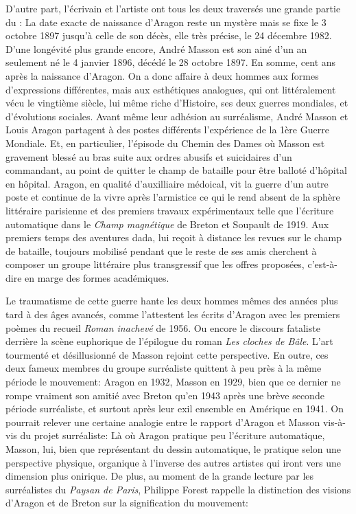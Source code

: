 D’autre part, l’écrivain et l’artiste ont tous les deux traversés une grande partie du : La date exacte de naissance d’Aragon reste un mystère mais se fixe le 3 octobre 1897 jusqu’à celle de son décès, elle très précise, le 24 décembre 1982. D’une longévité plus grande encore, André Masson est son ainé d’un an seulement né le 4 janvier 1896, décédé le 28 octobre 1897. En somme, cent ans après la naissance d’Aragon. On a donc affaire à deux hommes aux formes d’expressions différentes, mais aux esthétiques analogues, qui ont littéralement vécu le vingtième siècle, lui même riche d’Histoire, ses deux guerres mondiales, et d’évolutions sociales. Avant même leur adhésion au surréalisme, André Masson et Louis Aragon partagent à des postes différents l’expérience de la 1ère Guerre Mondiale. Et, en particulier, l’épisode du Chemin des Dames où Masson est gravement blessé au bras suite aux ordres abusifs et suicidaires d’un commandant, au point de quitter le champ de bataille pour être balloté d’hôpital en hôpital. Aragon, en qualité d'auxilliaire médoical, vit la guerre d’un autre poste et continue de la vivre après l’armistice ce qui le rend absent de la sphère littéraire parisienne et des premiers travaux expérimentaux telle que l’écriture automatique dans le \emph{Champ magnétique} de Breton et Soupault de 1919. Aux premiers temps des aventures dada, lui reçoit à distance les revues sur le champ de bataille, toujours mobilisé pendant que le reste de ses amis cherchent à composer un groupe littéraire plus transgressif que les offres proposées, c'est-à-dire en marge des formes académiques. 

Le traumatisme de cette guerre hante les deux hommes mêmes des années plus tard à des âges avancés, comme l’attestent les écrits d’Aragon avec les premiers poèmes du recueil \emph{Roman inachevé} de 1956. Ou encore  le discours fataliste derrière la scène euphorique de l’épilogue du roman \emph{Les cloches de Bâle}. L’art tourmenté et désillusionné de Masson rejoint cette perspective. En outre, ces deux fameux membres du groupe surréaliste quittent à peu près à la même période le mouvement: Aragon en 1932, Masson en 1929, bien que ce dernier ne rompe vraiment son amitié avec Breton qu’en 1943 après une brève seconde période surréaliste, et surtout après leur exil ensemble en Amérique en 1941. On pourrait relever une certaine analogie entre le rapport d’Aragon et Masson vis-à-vis du projet surréaliste: Là où Aragon pratique peu l’écriture automatique, Masson, lui, bien que représentant du dessin automatique, le pratique selon une perspective physique, organique à l’inverse des autres artistes qui iront vers une dimension plus onirique. De plus, au moment de la grande lecture par les surréalistes du \emph{Paysan de Paris}, Philippe Forest rappelle la distinction des visions d’Aragon et de Breton sur la signification du mouvement: 

